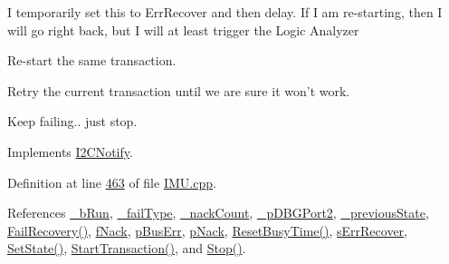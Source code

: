 I temporarily set this to ErrRecover and then delay. If I am re-\/starting, then I will go right back, but I will at least trigger the Logic Analyzer

Re-\/start the same transaction.

Retry the current transaction until we are sure it won't work.

Keep failing.. just stop. 



Implements \hyperlink{class_i2_c_notify_a8257aa3b48d0ae23dac613c0cf2b6fb4}{I2CNotify}.



Definition at line \hyperlink{_i_m_u_8cpp_source_l00463}{463} of file \hyperlink{_i_m_u_8cpp_source}{IMU.cpp}.



References \hyperlink{_i_m_u_8h_source_l00107}{\_\-bRun}, \hyperlink{_i_m_u_8h_source_l00087}{\_\-failType}, \hyperlink{_i_m_u_8h_source_l00109}{\_\-nackCount}, \hyperlink{_i_m_u_8h_source_l00113}{\_\-pDBGPort2}, \hyperlink{_i_m_u_8h_source_l00086}{\_\-previousState}, \hyperlink{_i_m_u_8cpp_source_l00398}{FailRecovery()}, \hyperlink{_i_m_u_8h_source_l00067}{fNack}, \hyperlink{_i_m_u_8h_source_l00060}{pBusErr}, \hyperlink{_i_m_u_8h_source_l00059}{pNack}, \hyperlink{_i_m_u_8h_source_l00190}{ResetBusyTime()}, \hyperlink{_i_m_u_8h_source_l00051}{sErrRecover}, \hyperlink{_i_m_u_8h_source_l00178}{SetState()}, \hyperlink{_i_m_u_8cpp_source_l00323}{StartTransaction()}, and \hyperlink{_i_m_u_8cpp_source_l00268}{Stop()}.


